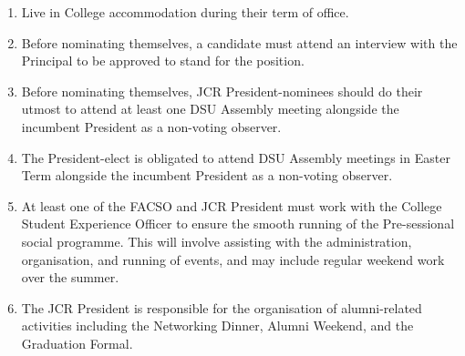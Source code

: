 \begin{enumerate}
        \item Live in College accommodation during their term of office.
        \item Before nominating themselves, a candidate must attend an interview with the Principal to be approved to stand for the position.
        \item Before nominating themselves, JCR President-nominees should do their utmost to attend at least one DSU Assembly meeting alongside the incumbent President as a non-voting observer.
        \item The President-elect is obligated to attend DSU Assembly meetings in Easter Term alongside the incumbent President as a non-voting observer.
        \item At least one of the FACSO and JCR President must work with the College Student Experience Officer to ensure the smooth running of the Pre-sessional social programme. This will involve assisting with the administration, organisation, and running of events, and may include regular weekend work over the summer.
        \item The JCR President is responsible for the organisation of alumni-related activities including the Networking Dinner, Alumni Weekend, and the Graduation Formal.
\end{enumerate}


